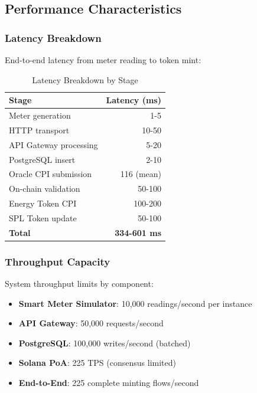 \documentclass[conference]{IEEEtran}
\begin{document}
\subsection{Performance Characteristics}

\subsubsection{Latency Breakdown}

End-to-end latency from meter reading to token mint:

\begin{table}[htbp]
\caption{Latency Breakdown by Stage}
\begin{center}
\begin{tabular}{lr}
\toprule
\textbf{Stage} & \textbf{Latency (ms)} \\
\midrule
Meter generation & 1-5 \\
HTTP transport & 10-50 \\
API Gateway processing & 5-20 \\
PostgreSQL insert & 2-10 \\
Oracle CPI submission & 116 (mean) \\
On-chain validation & 50-100 \\
Energy Token CPI & 100-200 \\
SPL Token update & 50-100 \\
\midrule
\textbf{Total} & \textbf{334-601 ms} \\
\bottomrule
\end{tabular}
\label{tab:latency}
\end{center}
\end{table}

\subsubsection{Throughput Capacity}

System throughput limits by component:

\begin{itemize}
    \item \textbf{Smart Meter Simulator}: 10,000 readings/second per instance
    \item \textbf{API Gateway}: 50,000 requests/second
    \item \textbf{PostgreSQL}: 100,000 writes/second (batched)
    \item \textbf{Solana PoA}: 225 TPS (consensus limited)
    \item \textbf{End-to-End}: 225 complete minting flows/second
\end{itemize}
\end{document}
